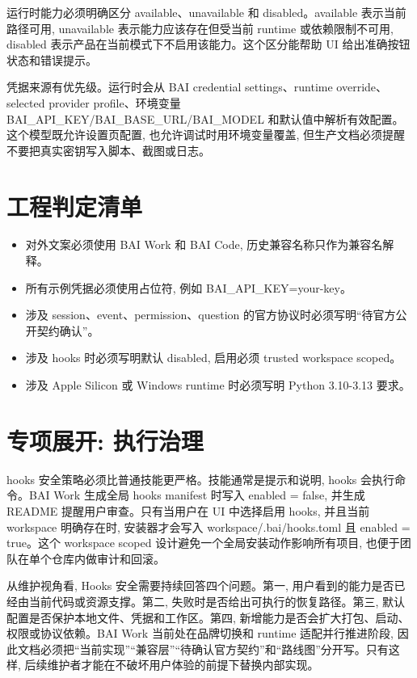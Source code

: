 运行时能力必须明确区分 available、unavailable 和 disabled。available 表示当前路径可用, unavailable 表示能力应该存在但受当前 runtime 或依赖限制不可用, disabled 表示产品在当前模式下不启用该能力。这个区分能帮助 UI 给出准确按钮状态和错误提示。

凭据来源有优先级。运行时会从 BAI credential settings、runtime override、selected provider profile、环境变量 BAI\_API\_KEY/BAI\_BASE\_URL/BAI\_MODEL 和默认值中解析有效配置。这个模型既允许设置页配置, 也允许调试时用环境变量覆盖, 但生产文档必须提醒不要把真实密钥写入脚本、截图或日志。

\section{工程判定清单}
\begin{itemize}
  \item 对外文案必须使用 BAI Work 和 BAI Code, 历史兼容名称只作为兼容名解释。
  \item 所有示例凭据必须使用占位符, 例如 BAI\_API\_KEY=your-key。
  \item 涉及 session、event、permission、question 的官方协议时必须写明“待官方公开契约确认”。
  \item 涉及 hooks 时必须写明默认 disabled, 启用必须 trusted workspace scoped。
  \item 涉及 Apple Silicon 或 Windows runtime 时必须写明 Python 3.10-3.13 要求。
\end{itemize}

\section{专项展开: 执行治理}
hooks 安全策略必须比普通技能更严格。技能通常是提示和说明, hooks 会执行命令。BAI Work 生成全局 hooks manifest 时写入 enabled = false, 并生成 README 提醒用户审查。只有当用户在 UI 中选择启用 hooks, 并且当前 workspace 明确存在时, 安装器才会写入 workspace/.bai/hooks.toml 且 enabled = true。这个 workspace scoped 设计避免一个全局安装动作影响所有项目, 也便于团队在单个仓库内做审计和回滚。

从维护视角看, Hooks 安全需要持续回答四个问题。第一, 用户看到的能力是否已经由当前代码或资源支撑。第二, 失败时是否给出可执行的恢复路径。第三, 默认配置是否保护本地文件、凭据和工作区。第四, 新增能力是否会扩大打包、启动、权限或协议依赖。BAI Work 当前处在品牌切换和 runtime 适配并行推进阶段, 因此文档必须把“当前实现”“兼容层”“待确认官方契约”和“路线图”分开写。只有这样, 后续维护者才能在不破坏用户体验的前提下替换内部实现。

